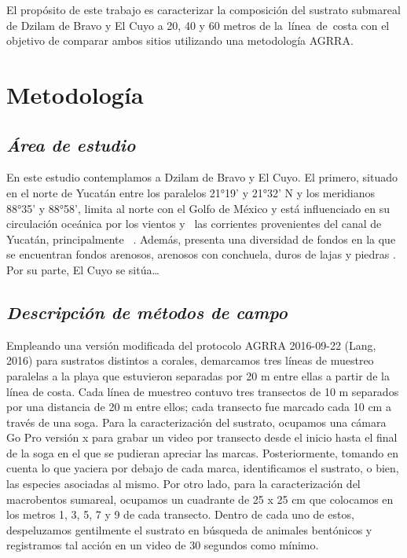 \documentclass[
  authoryear,
  preprint,
  3p,
  twocolumn]{elsarticle}
\begin{document}
El propósito de este trabajo es caracterizar la composición del sustrato
submareal de Dzilam de Bravo y El Cuyo a 20, 40 y 60 metros de
la~línea~de~costa con el objetivo de comparar ambos sitios utilizando
una metodología AGRRA.

\hypertarget{metodologuxeda}{%
\section{Metodología}\label{metodologuxeda}}

\hypertarget{uxe1rea-de-estudio}{%
\subsection{\texorpdfstring{\emph{Área de
estudio}}{Área de estudio}}\label{uxe1rea-de-estudio}}

En este estudio contemplamos a Dzilam de Bravo y El Cuyo. El primero,
situado en el norte de Yucatán entre los paralelos 21°19' y 21°32' N y
los meridianos 88°35' y 88°58', limita al norte con el Golfo de México y
está influenciado en su circulación oceánica por los vientos y~ las
corrientes provenientes del canal de Yucatán, principalmente~
\citep{1834/36164}. Además, presenta una diversidad de fondos en la que
se encuentran fondos arenosos, arenosos con conchuela, duros de lajas y
piedras \citep{1834/36164}. Por su parte, El Cuyo se sitúa\ldots{}

\hypertarget{descripciuxf3n-de-muxe9todos-de-campo}{%
\subsection{\texorpdfstring{\emph{Descripción de métodos de
campo}}{Descripción de métodos de campo}}\label{descripciuxf3n-de-muxe9todos-de-campo}}

Empleando una versión modificada del protocolo AGRRA 2016-09-22 (Lang,
2016) para sustratos distintos a corales, demarcamos tres líneas de
muestreo paralelas a la playa que estuvieron separadas por 20 m entre
ellas a partir de la línea de costa. Cada línea de muestreo contuvo tres
transectos de 10 m separados por una distancia de 20 m entre ellos; cada
transecto fue marcado cada 10 cm a través de una soga. Para la
caracterización del sustrato, ocupamos una cámara Go Pro versión x para
grabar un video por transecto desde el inicio hasta el final de la soga
en el que se pudieran apreciar las marcas. Posteriormente, tomando en
cuenta lo que yaciera por debajo de cada marca, identificamos el
sustrato, o bien, las especies asociadas al mismo. Por otro lado, para
la caracterización del macrobentos sumareal, ocupamos un cuadrante de 25
x 25 cm que colocamos en los metros 1, 3, 5, 7 y 9 de cada transecto.
Dentro de cada uno de estos, despeluzamos gentilmente el sustrato en
búsqueda de animales bentónicos y registramos tal acción en un video de
30 segundos como mínimo.
\end{document}
